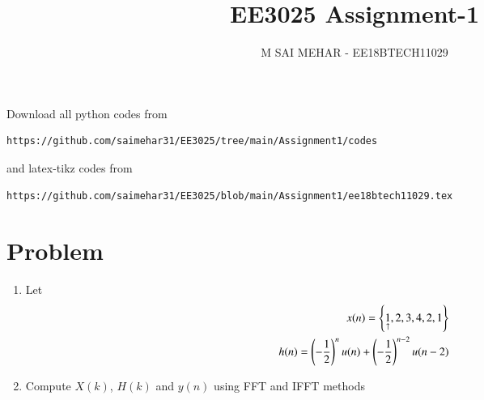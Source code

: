 \documentclass[journal,12pt,twocolumn]{IEEEtran}
\renewcommand\thesection{\arabic{section}}
\begin{document}
     \def\rightbox#1{\makebox[0in][r]{#1}}
     \def\centbox#1{\makebox[0in]{#1}}
     \def\topbox#1{\raisebox{-\baselineskip}[0in][0in]{#1}}
     \def\midbox#1{\raisebox{-0.5\baselineskip}[0in][0in]{#1}}
\vspace{3cm}
\title{EE3025 Assignment-1}
\author{M SAI MEHAR - EE18BTECH11029}
\maketitle
\newpage
\bigskip
\renewcommand{\thefigure}{\theenumi}
\renewcommand{\thetable}{\theenumi}
Download all python codes from 
\begin{lstlisting}
https://github.com/saimehar31/EE3025/tree/main/Assignment1/codes
\end{lstlisting}
%
and latex-tikz codes from 
%
\begin{lstlisting}
https://github.com/saimehar31/EE3025/blob/main/Assignment1/ee18btech11029.tex
\end{lstlisting}

\section{Problem}
\begin{enumerate}[label=\thesection.\arabic*.,ref=\thesection.\theenumi]
    
    \item Let
    \begin{align}
        x(n) = \left\{\underset{\uparrow}{1},2,3,4,2,1\right\} \\
        h(n)=\left(-\frac{1}{2}\right)^{n} u(n)+\left(-\frac{1}{2}\right)^{n-2} u(n-2)
    \end{align}
    
    \item Compute $X(k)$, $H(k)$ and $y(n)$ using FFT and IFFT methods

\end{enumerate}
\end{document}
